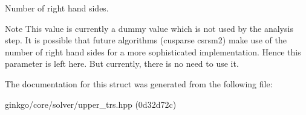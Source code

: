 Number of right hand sides. 

\begin{DoxyNote}{Note}
This value is currently a dummy value which is not used by the analysis step. It is possible that future algorithms (cusparse csrsm2) make use of the number of right hand sides for a more sophisticated implementation. Hence this parameter is left here. But currently, there is no need to use it. 
\end{DoxyNote}


The documentation for this struct was generated from the following file\+:\begin{DoxyCompactItemize}
\item 
ginkgo/core/solver/upper\+\_\+trs.\+hpp (0d32d72c)\end{DoxyCompactItemize}
